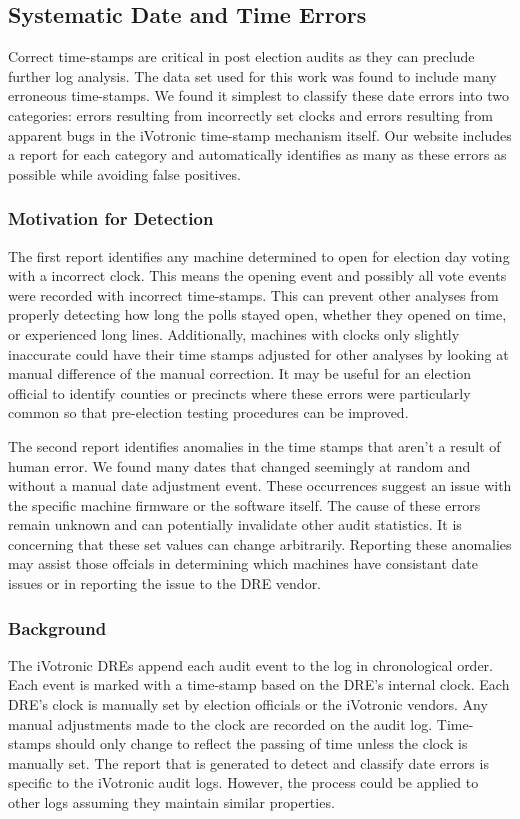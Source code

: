 \subsection{Systematic Date and Time Errors}\label{an:date} 
Correct time-stamps are critical in post election audits as they can preclude further log analysis. The data set used for this work was found to include many erroneous time-stamps. We found it simplest to classify these date errors into two categories: errors resulting from incorrectly set clocks and errors resulting from apparent bugs in the iVotronic time-stamp mechanism itself. Our website includes a report for each category and automatically identifies as many as these errors as possible while avoiding false positives.  

\subsubsection{Motivation for Detection}
The first report identifies any machine determined to open for election day voting with a incorrect clock.  This means the opening event and possibly all vote events were recorded with incorrect time-stamps. This can prevent other analyses from properly detecting how long the polls stayed open, whether they opened on time, or experienced long lines. Additionally, machines with clocks only slightly inaccurate could have their time stamps adjusted for other analyses by looking at manual difference of the manual correction. It may be useful for an election official to identify counties or precincts where these errors were particularly common so that pre-election testing procedures can be improved.

The second report identifies anomalies in the time stamps that aren't a result of human error. We found many dates that changed seemingly at random and without a manual date adjustment event. These occurrences suggest an issue with the specific machine firmware or the software itself. The cause of these errors remain unknown and can potentially invalidate other audit statistics. It is concerning that these set values can change arbitrarily. Reporting these anomalies may assist those offcials in determining which machines have consistant date issues or in reporting the issue to the DRE vendor.

\subsubsection{Background}
The iVotronic DREs append each audit event to the log in chronological order.  Each event is marked with a time-stamp based on the DRE's internal clock. Each DRE's clock is manually set by election officials or the iVotronic vendors. Any manual adjustments made to the clock are recorded on the audit log. Time-stamps should only change to reflect the passing of time unless the clock is manually set. The report that is generated to detect and classify date errors is specific to the iVotronic audit logs.  However, the process could be applied to other logs assuming they maintain similar properties.  

